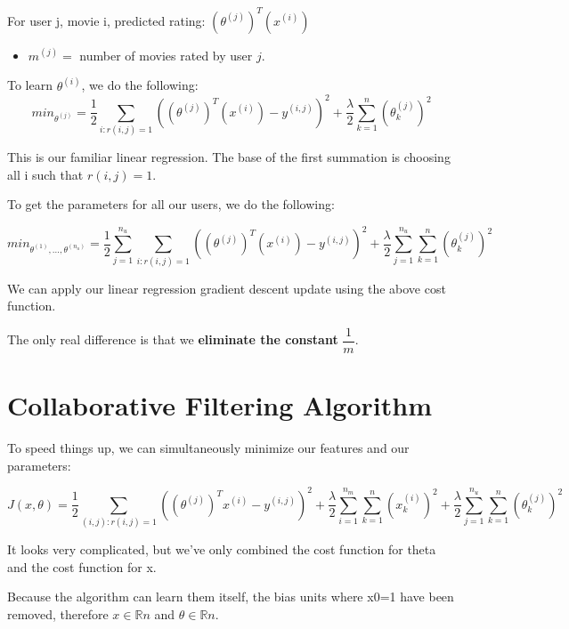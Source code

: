For user j, movie i, predicted rating: $(\theta^{(j)})^T(x^{(i)})$
\begin{itemize}
\item $m^{(j)} =$ number of movies rated by user $j$.
\end{itemize}

To learn $\theta^{(i)}$, we do the following:
\begin{equation}
min_{\theta^{(j)}} = \dfrac{1}{2}\displaystyle \sum_{i:r(i,j)=1} ((\theta^{(j)})^T(x^{(i)}) - y^{(i,j)})^2 + \dfrac{\lambda}{2} \sum_{k=1}^n(\theta_k^{(j)})^2
\end{equation}

This is our familiar linear regression. The base of the first summation is choosing all i such that $r(i,j) = 1$.

To get the parameters for all our users, we do the following:

\begin{equation}
min_{\theta^{(1)},\dots,\theta^{(n_u)}} = \dfrac{1}{2}\displaystyle \sum_{j=1}^{n_u} \sum_{i:r(i,j)=1} ((\theta^{(j)})^T(x^{(i)}) - y^{(i,j)})^2 + \dfrac{\lambda}{2} \sum_{j=1}^{n_u} \sum_{k=1}^n(\theta_k^{(j)})^2
\end{equation}

We can apply our linear regression gradient descent update using the above cost function.

The only real difference is that we \textbf{eliminate the constant} $\dfrac{1}{m}$.

\section{Collaborative Filtering Algorithm}
To speed things up, we can simultaneously minimize our features and our parameters:

\begin{equation}
J(x,\theta) = \dfrac{1}{2} \displaystyle \sum_{(i,j):r(i,j)=1}((\theta^{(j)})^Tx^{(i)} - y^{(i,j)})^2 + \dfrac{\lambda}{2}\sum_{i=1}^{n_m} \sum_{k=1}^{n} (x_k^{(i)})^2 + \dfrac{\lambda}{2}\sum_{j=1}^{n_u} \sum_{k=1}^{n} (\theta_k^{(j)})^2
\end{equation}

It looks very complicated, but we've only combined the cost function for theta and the cost function for x.

Because the algorithm can learn them itself, the bias units where x0=1 have been removed, therefore $x\in \mathbb{R}n$ and $\theta \in \mathbb{R}n$.

